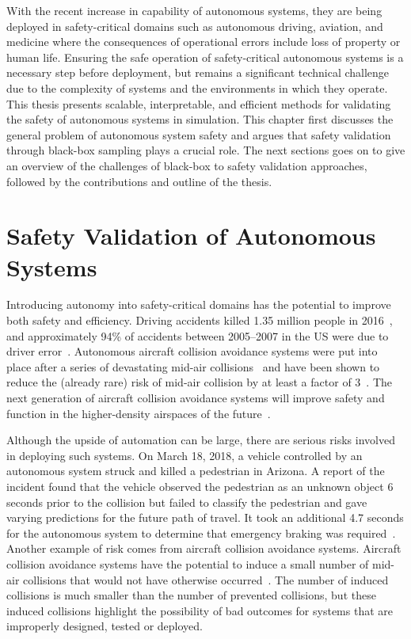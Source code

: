 With the recent increase in capability of autonomous systems, they are being deployed in safety-critical domains such as autonomous driving, aviation, and medicine where the consequences of operational errors include loss of property or human life. Ensuring the safe operation of safety-critical autonomous systems is a necessary step before deployment, but remains a significant technical challenge due to the complexity of systems and the environments in which they operate. This thesis presents scalable, interpretable, and efficient methods for validating the safety of autonomous systems in simulation. This chapter first discusses the general problem of autonomous system safety and argues that safety validation through black-box sampling plays a crucial role. The next sections goes on to give an overview of the challenges of black-box to safety validation approaches, followed by the contributions and outline of the thesis. 

\section{Safety Validation of Autonomous Systems}

Introducing autonomy into safety-critical domains has the potential to improve both safety and efficiency. Driving accidents killed \num{1.35} million people in 2016~\cite{world2019global}, and approximately \num{94}\% of accidents between 2005--2007 in the US were due to driver error~\cite{singh2015critical}. Autonomous aircraft collision avoidance systems were put into place after a series of devastating mid-air collisions~\cite{federal2011introduction} and have been shown to reduce the (already rare) risk of mid-air collision by at least a factor of 3~\cite{arino2002studies}. The next generation of aircraft collision avoidance systems will improve safety and function in the higher-density airspaces of the future~\cite{kochenderfer2012next}.

Although the upside of automation can be large, there are serious risks involved in deploying such systems. On March 18, 2018, a vehicle controlled by an autonomous system struck and killed a pedestrian in Arizona. A report of the incident found that the vehicle observed the pedestrian as an unknown object \num{6} seconds prior to the collision but failed to classify the pedestrian and gave varying predictions for the future path of travel. It took an additional \num{4.7} seconds for the autonomous system to determine that emergency braking was required~\cite{board2018preliminary}. Another example of risk comes from aircraft collision avoidance systems. Aircraft collision avoidance systems have the potential to induce a small number of mid-air collisions that would not have otherwise occurred~\cite{arino2002studies}. The number of induced collisions is much smaller than the number of prevented collisions, but these induced collisions highlight the possibility of bad outcomes for systems that are improperly designed, tested or deployed.

